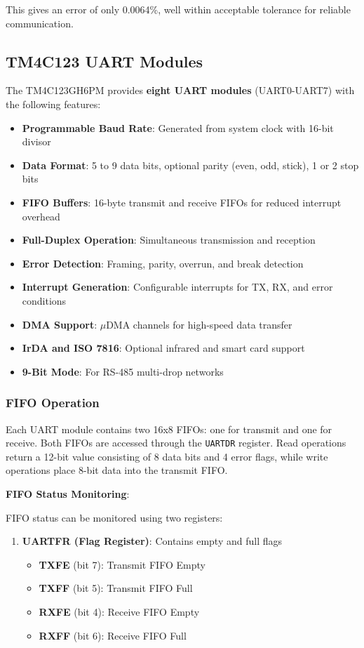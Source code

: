 This gives an error of only 0.0064\%, well within acceptable tolerance for reliable communication.

\subsection{TM4C123 UART Modules}

The TM4C123GH6PM provides \textbf{eight UART modules} (UART0-UART7) with the following features:

\begin{itemize}[nosep]
  \item \textbf{Programmable Baud Rate}: Generated from system clock with 16-bit divisor
  \item \textbf{Data Format}: 5 to 9 data bits, optional parity (even, odd, stick), 1 or 2 stop bits
  \item \textbf{FIFO Buffers}: 16-byte transmit and receive FIFOs for reduced interrupt overhead
  \item \textbf{Full-Duplex Operation}: Simultaneous transmission and reception
  \item \textbf{Error Detection}: Framing, parity, overrun, and break detection
  \item \textbf{Interrupt Generation}: Configurable interrupts for TX, RX, and error conditions
  \item \textbf{DMA Support}: $\mu$DMA channels for high-speed data transfer
  \item \textbf{IrDA and ISO 7816}: Optional infrared and smart card support
  \item \textbf{9-Bit Mode}: For RS-485 multi-drop networks
\end{itemize}

\subsubsection{FIFO Operation}

Each UART module contains two 16x8 FIFOs: one for transmit and one for receive. Both FIFOs are accessed through the \texttt{UARTDR} register. Read operations return a 12-bit value consisting of 8 data bits and 4 error flags, while write operations place 8-bit data into the transmit FIFO.


\textbf{FIFO Status Monitoring}:

FIFO status can be monitored using two registers:

\begin{enumerate}[nosep]
  \item \textbf{UARTFR (Flag Register)}: Contains empty and full flags
  \begin{itemize}[nosep]
    \item \textbf{TXFE} (bit 7): Transmit FIFO Empty
    \item \textbf{TXFF} (bit 5): Transmit FIFO Full
    \item \textbf{RXFE} (bit 4): Receive FIFO Empty
    \item \textbf{RXFF} (bit 6): Receive FIFO Full
  \end{itemize}
  
\end{enumerate}



